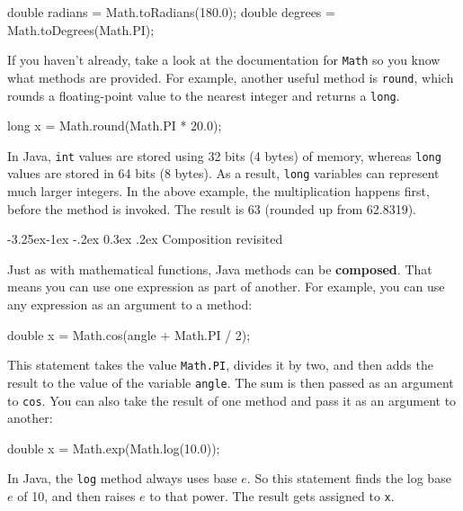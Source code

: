 \documentclass[12pt]{book}
\makeatletter
\renewcommand\subsection{\@startsection{subsection}{2}{\z@}%
    {-3.25ex\@plus -1ex \@minus -.2ex}%
    {0.3ex \@plus .2ex}%
    {\normalfont\large\bfseries}}
\theoremstyle{exercise}
\newcommand{\java}[1]{\lstinline{#1}} %
\makeatother
\begin{document}
\begin{code}
    double radians = Math.toRadians(180.0);
    double degrees = Math.toDegrees(Math.PI);
\end{code}


If you haven't already, take a look at the documentation for \java{Math} so you know what methods are provided.
For example, another useful method is \java{round}, which rounds a floating-point value to the nearest integer and returns a \java{long}.

\begin{code}
    long x = Math.round(Math.PI * 20.0);
\end{code}

In Java, \java{int} values are stored using 32 bits (4 bytes) of memory, whereas \java{long} values are stored in 64 bits (8 bytes).
As a result, \java{long} variables can represent much larger integers.
In the above example, the multiplication happens first, before the method is invoked.
The result is 63 (rounded up from 62.8319).

\subsection{Composition revisited}


Just as with mathematical functions, Java methods can be {\bf composed}.
That means you can use one expression as part of another.
For example, you can use any expression as an argument to a method:

\begin{code}
    double x = Math.cos(angle + Math.PI / 2);
\end{code}

This statement takes the value \java{Math.PI}, divides it by two, and then adds the result to the value of the variable \java{angle}.
The sum is then passed as an argument to \java{cos}.
You can also take the result of one method and pass it as an argument to another:

\begin{code}
    double x = Math.exp(Math.log(10.0));
\end{code}

In Java, the \java{log} method always uses base $e$.
So this statement finds the log base $e$ of 10, and then raises $e$ to that power.
The result gets assigned to \java{x}.
\end{document}
